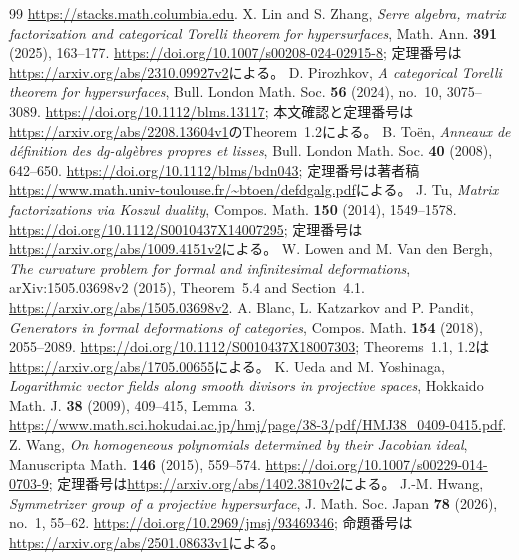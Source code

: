 \begin{thebibliography}{99}
\url{https://stacks.math.columbia.edu}.
 X. Lin and S. Zhang,
\emph{Serre algebra, matrix factorization and categorical Torelli theorem for hypersurfaces},
Math. Ann. \textbf{391} (2025), 163--177.
\url{https://doi.org/10.1007/s00208-024-02915-8};
定理番号は\url{https://arxiv.org/abs/2310.09927v2}による。
 D. Pirozhkov,
\emph{A categorical Torelli theorem for hypersurfaces},
Bull. London Math. Soc. \textbf{56} (2024), no.~10, 3075--3089.
\url{https://doi.org/10.1112/blms.13117};
本文確認と定理番号は\url{https://arxiv.org/abs/2208.13604v1}のTheorem~1.2による。
 B. To\"en,
\emph{Anneaux de d\'efinition des dg-alg\`ebres propres et lisses},
Bull. London Math. Soc. \textbf{40} (2008), 642--650.
\url{https://doi.org/10.1112/blms/bdn043};
定理番号は著者稿
\url{https://www.math.univ-toulouse.fr/~btoen/defdgalg.pdf}による。
 J. Tu,
\emph{Matrix factorizations via Koszul duality},
Compos. Math. \textbf{150} (2014), 1549--1578.
\url{https://doi.org/10.1112/S0010437X14007295};
定理番号は\url{https://arxiv.org/abs/1009.4151v2}による。
 W. Lowen and M. Van den Bergh,
\emph{The curvature problem for formal and infinitesimal deformations},
arXiv:1505.03698v2 (2015), Theorem~5.4 and Section~4.1.
\url{https://arxiv.org/abs/1505.03698v2}.
 A. Blanc, L. Katzarkov and P. Pandit,
\emph{Generators in formal deformations of categories},
Compos. Math. \textbf{154} (2018), 2055--2089.
\url{https://doi.org/10.1112/S0010437X18007303};
Theorems~1.1, 1.2は\url{https://arxiv.org/abs/1705.00655}による。
 K. Ueda and M. Yoshinaga,
\emph{Logarithmic vector fields along smooth divisors in projective spaces},
Hokkaido Math. J. \textbf{38} (2009), 409--415, Lemma~3.
\url{https://www.math.sci.hokudai.ac.jp/hmj/page/38-3/pdf/HMJ38_0409-0415.pdf}.
 Z. Wang,
\emph{On homogeneous polynomials determined by their Jacobian ideal},
Manuscripta Math. \textbf{146} (2015), 559--574.
\url{https://doi.org/10.1007/s00229-014-0703-9};
定理番号は\url{https://arxiv.org/abs/1402.3810v2}による。
 J.-M. Hwang,
\emph{Symmetrizer group of a projective hypersurface},
J. Math. Soc. Japan \textbf{78} (2026), no.~1, 55--62.
\url{https://doi.org/10.2969/jmsj/93469346};
命題番号は\url{https://arxiv.org/abs/2501.08633v1}による。
\end{thebibliography}
